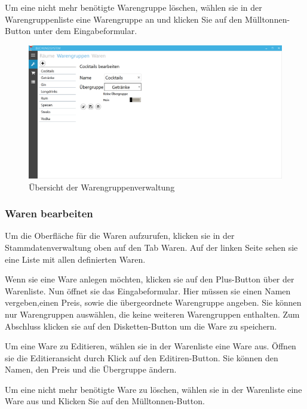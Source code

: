 Um eine nicht mehr benötigte Warengruppe löschen, wählen sie in der Warengruppenliste eine Warengruppe an und klicken Sie auf den Mülltonnen-Button unter dem Eingabeformular.

\begin{figure}[h]
	\begin{center}
		\includegraphics[width=\columnwidth]{Benutzerhandbuch/Warengruppenverwaltung.png}
	\end{center}
	\caption{Übersicht der Warengruppenverwaltung}
	\label{fig:productgroup-management}
\end{figure}

\subsubsection{Waren bearbeiten}

Um die Oberfläche für die Waren aufzurufen, klicken sie in der Stammdatenverwaltung oben auf den Tab Waren. Auf der linken Seite sehen sie eine Liste mit allen definierten Waren. 

Wenn sie eine Ware anlegen möchten, klicken sie auf den Plus-Button über der Warenliste. Nun öffnet sie das Eingabeformular. Hier müssen sie einen Namen vergeben,einen Preis, sowie die übergeordnete Warengruppe angeben. 
Sie können nur Warengruppen auswählen, die keine weiteren Warengruppen enthalten.
Zum Abschluss klicken sie auf den Disketten-Button um die Ware zu speichern.

Um eine Ware zu Editieren, wählen sie in der Warenliste eine Ware aus. Öffnen sie die Editieransicht durch Klick auf den Editiren-Button. 
Sie können den Namen, den Preis und die Übergruppe ändern.

Um eine nicht mehr benötigte Ware zu löschen, wählen sie in der Warenliste eine Ware aus und Klicken Sie auf den Mülltonnen-Button.

